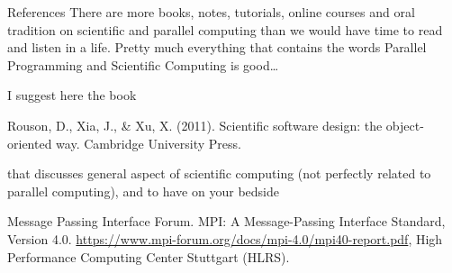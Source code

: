 \documentclass[xcolor={svgnames,usenames}]{beamer}
\begin{document}
\begin{frame}{References}
There are more books, notes, tutorials, online courses and oral tradition on scientific and parallel computing than we would have time to read and listen in a life. Pretty much everything that contains the words Parallel Programming and Scientific Computing is good\ldots 

I suggest here the book
\begin{thebibliography}{10}
	 Rouson, D., Xia, J., \& Xu, X. (2011). Scientific software design: the object-oriented way. Cambridge University Press.
\end{thebibliography}
that discusses general aspect of scientific computing (not perfectly related to parallel computing), and to have on your bedside
\begin{thebibliography}{10}
	  Message Passing Interface Forum. MPI: A Message-Passing Interface Standard, Version 4.0. \url{https://www.mpi-forum.org/docs/mpi-4.0/mpi40-report.pdf}, High Performance Computing Center Stuttgart (HLRS).
\end{thebibliography}
\end{frame}
\end{document}
